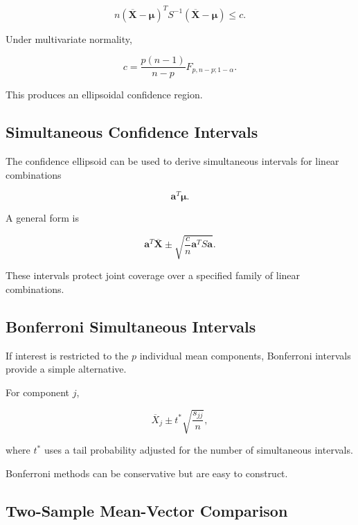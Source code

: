 \[
\boxed{
n
(
\overline{\mathbf{X}}
-
\boldsymbol{\mu}
)^T
S^{-1}
(
\overline{\mathbf{X}}
-
\boldsymbol{\mu}
)
\leq
c.
}
\]

Under multivariate normality,

\[
\boxed{
c
=
\frac{
p(n-1)
}{
n-p
}
F_{p,n-p;1-\alpha}.
}
\]

This produces an ellipsoidal confidence region.

\subsection{Simultaneous Confidence Intervals}
\label{subsec:simultaneous-multivariate-ci}

The confidence ellipsoid can be used to derive simultaneous intervals for
linear combinations

\[
\mathbf{a}^T\boldsymbol{\mu}.
\]

A general form is

\[
\boxed{
\mathbf{a}^T
\overline{\mathbf{X}}
\pm
\sqrt{
\frac{c}{n}
\mathbf{a}^TS\mathbf{a}
}.
}
\]

These intervals protect joint coverage over a specified family of linear
combinations.

\subsection{Bonferroni Simultaneous Intervals}
\label{subsec:bonferroni-multivariate-ci}

If interest is restricted to the \(p\) individual mean components,
Bonferroni intervals provide a simple alternative.

For component \(j\),

\[
\boxed{
\overline{X}_j
\pm
t^*
\sqrt{
\frac{s_{jj}}{n}
},
}
\]

where \(t^*\) uses a tail probability adjusted for the number of
simultaneous intervals.

Bonferroni methods can be conservative but are easy to construct.

\subsection{Two-Sample Mean-Vector Comparison}
\label{subsec:two-sample-multivariate-mean}

